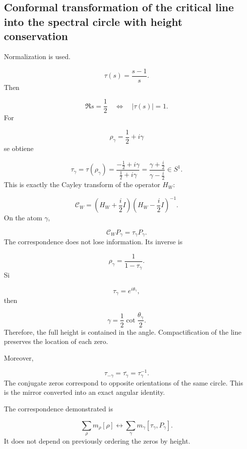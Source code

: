\subsection{Conformal transformation of the critical line into the spectral circle with height conservation}
Normalization is used.\par
\[
\tau(s)=\frac{s-1}{s}.
\]
Then\par
\[
\Re s=\frac12
\quad\Longleftrightarrow\quad
|\tau(s)|=1.
\]
For\par
\[
\rho_\gamma=\frac12+i\gamma
\]
se obtiene\par
\[
\tau_\gamma
=
\tau(\rho_\gamma)
=
\frac{-\frac12+i\gamma}{\frac12+i\gamma}
=
\frac{\gamma+\frac i2}{\gamma-\frac i2}
\in S^1.
\]
This is exactly the Cayley transform of the operator \(H_W\):\par
\[
\mathcal C_W
=
\left(H_W+\frac i2I\right)
\left(H_W-\frac i2I\right)^{-1}.
\]
On the atom \(\gamma\),\par
\[
\mathcal C_WP_\gamma
=
\tau_\gamma P_\gamma.
\]
The correspondence does not lose information. Its inverse is\par
\[
\rho_\gamma=\frac1{1-\tau_\gamma}.
\]
Si\par
\[
\tau_\gamma=e^{i\theta_\gamma},
\]
then\par
\[
\boxed{
\gamma
=
\frac12\cot\frac{\theta_\gamma}{2}.
}
\]
Therefore, the full height is contained in the angle. Compactification of the line preserves the location of each zero.\par
Moreover,\par
\[
\tau_{-\gamma}
=
\overline{\tau_\gamma}
=
\tau_\gamma^{-1}.
\]
The conjugate zeros correspond to opposite orientations of the same circle. This is the mirror converted into an exact angular identity.\par
The correspondence demonstrated is\par
\[
\boxed{
\sum_\rho m_\rho[\rho]
\longleftrightarrow
\sum_\gamma m_\gamma
[\tau_\gamma,P_\gamma].
}
\]
It does not depend on previously ordering the zeros by height.\par
{}
